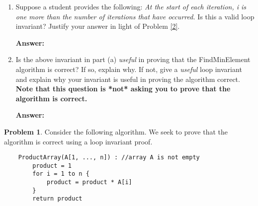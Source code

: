 \documentclass[12pt]{article}
\theoremstyle{definition}
\theoremstyle{definition}
\newtheorem{problem}{Problem}
\theoremstyle{definition}
\begin{document}
\begin{enumerate}[label=(\alph*)]
\item Suppose a student provides the following: \textit{At the start of each iteration, i is one more than the number of iterations that have occurred.} Is this a valid loop invariant? Justify your answer in light of Problem \ref{2}. 

\textbf{Answer:}

\vskip 80pt
\item  Is the above invariant in part (a) \textit{useful} in proving that the \textsf{FindMinElement} algorithm is correct? If so, explain why. If not, give a \textit{useful} loop invariant and explain why your invariant is useful in proving the algorithm correct. \textbf{Note that this question is *not* asking you to prove that the algorithm is correct.}

\textbf{Answer:}
\end{enumerate}


\newpage
\begin{problem} \label{4}
Consider the following algorithm. We seek to prove that the algorithm is correct using a loop invariant proof.
\begin{small}
	\begin{verbatim}
	ProductArray(A[1, ..., n]) : //array A is not empty
	    product = 1
	    for i = 1 to n {
	        product = product * A[i]    
	    }
	    return product
	\end{verbatim}
\end{small}
\end{problem}
\end{document}
